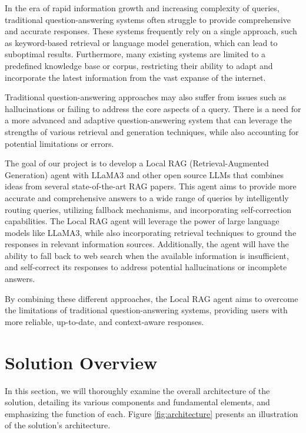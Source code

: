 In the era of rapid information growth and increasing complexity of queries, traditional question-answering systems often struggle to provide comprehensive and accurate responses. These systems frequently rely on a single approach, such as keyword-based retrieval or language model generation, which can lead to suboptimal results. Furthermore, many existing systems are limited to a predefined knowledge base or corpus, restricting their ability to adapt and incorporate the latest information from the vast expanse of the internet.

Traditional question-answering approaches may also suffer from issues such as hallucinations \cite{zhang2023sirens} or failing to address the core aspects of a query. There is a need for a more advanced and adaptive question-answering system that can leverage the strengths of various retrieval and generation techniques, while also accounting for potential limitations or errors.

The goal of our project is to develop a Local RAG (Retrieval-Augmented Generation) agent with LLaMA3 and other open source LLMs that combines ideas from several state-of-the-art RAG papers. This agent aims to provide more accurate and comprehensive answers to a wide range of queries by intelligently routing queries, utilizing fallback mechanisms, and incorporating self-correction capabilities. The Local RAG agent will leverage the power of large language models like LLaMA3, while also incorporating retrieval techniques to ground the responses in relevant information sources. Additionally, the agent will have the ability to fall back to web search when the available information is insufficient, and self-correct its responses to address potential hallucinations or incomplete answers.

By combining these different approaches, the Local RAG agent aims to overcome the limitations of traditional question-answering systems, providing users with more reliable, up-to-date, and context-aware responses.

\section{Solution Overview}

In this section, we will thoroughly examine the overall architecture of the solution, detailing its various components and fundamental elements, and emphasizing the function of each. Figure \ref{fig:architecture} presents an illustration of the solution's architecture.

